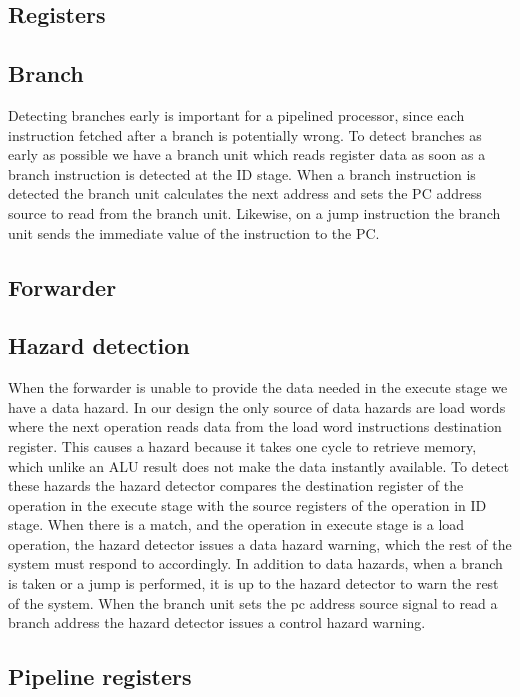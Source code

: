 \subsection{Registers}

\subsection{Branch}
Detecting branches early is important for a pipelined processor, since each instruction fetched after a branch is potentially wrong.
To detect branches as early as possible we have a branch unit which reads register data as soon as a branch instruction is detected at the ID stage.
When a branch instruction is detected the branch unit calculates the next address and sets the PC address source to read from the branch unit.
Likewise, on a jump instruction the branch unit sends the immediate value of the instruction to the PC.

\subsection{Forwarder}
\label{section:Forwarder}

\subsection{Hazard detection}
When the forwarder is unable to provide the data needed in the execute stage we have a data hazard. In our design the only source of data hazards are load words where the next operation reads data from the load word instructions destination register. 
This causes a hazard because it takes one cycle to retrieve memory, which unlike an ALU result does not make the data instantly available. 
To detect these hazards the hazard detector compares the destination register of the operation in the execute stage with the source registers of the operation in ID stage.
When there is a match, and the operation in execute stage is a load operation, the hazard detector issues a data hazard warning, which the rest of the system must respond to accordingly.
In addition to data hazards, when a branch is taken or a jump is performed, it is up to the hazard detector to warn the rest of the system.
When the branch unit sets the pc address source signal to read a branch address the hazard detector issues a control hazard warning.

\subsection{Pipeline registers}
